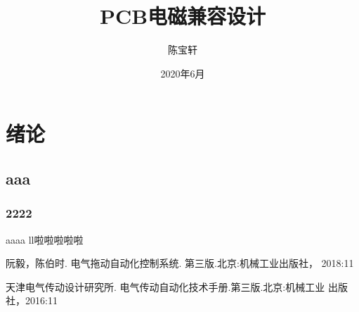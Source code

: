 \documentclass[forprint]{CSUBachelor}
\begin{document}
\title{PCB电磁兼容设计}
\author{陈宝轩}                            		%

\date{2020年6月}                    		%

\maketitle
\frontmatter
{}              %
\iffalse	%
\pdfbookmark[0]{目录}{toc}
\tableofcontents   %
\fi

\mainmatter

\chapter{绪论}

\section{aaa}

\subsection{2222}

aaaa ll啦啦啦啦啦



\cleardoublepage{}
{}
\wuhao\kaishu
\begin{thebibliography}{00}

   阮毅，陈伯时. 电气拖动自动化控制系统. 第三版.北京:机械工业出版社， 2018:11

   天津电气传动设计研究所. 电气传动自动化技术手册.第三版.北京:机械工业 出版社，2016:11
  
\end{thebibliography}
\end{document}
